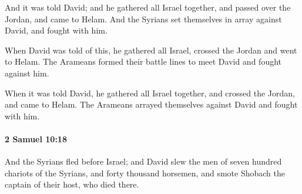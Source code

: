 			\begin{versebox}
					\item[BHS] 
					\item[ASV] And it was told David; and he gathered all Israel together, and passed over the Jordan, and came to Helam. And the Syrians set themselves in array against David, and fought with him.
					\item[NIV] When David was told of this, he gathered all Israel, crossed the Jordan and went to Helam. The Arameans formed their battle lines to meet David and fought against him.
					\item[NRSV] When it was told David, he gathered all Israel together, and crossed the Jordan, and came to Helam. The Arameans arrayed themselves against David and fought with him.
			\end{versebox}

		\paragraph{2 Samuel 10:18} %
			\label{2SAMUEL-10-18}

			And the Syrians fled before Israel; and David slew the men of seven hundred chariots of the Syrians, and forty thousand horsemen, and smote Shobach the captain of their host, who died there.

